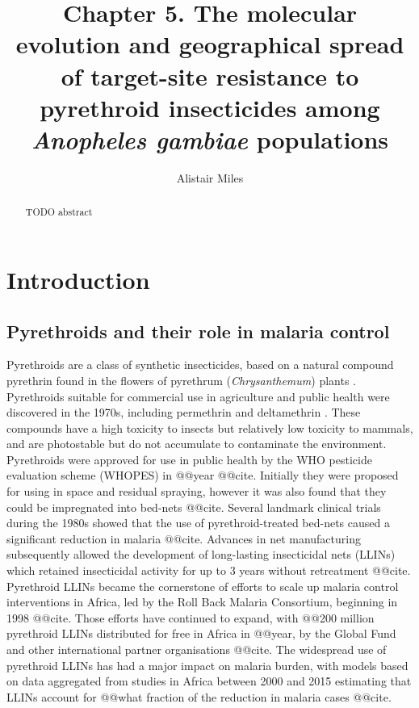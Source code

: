 \documentclass[a4paper,11pt,abstracton,hidelinks]{scrartcl}
\title{Chapter 5. The molecular evolution and geographical spread of target-site resistance to pyrethroid insecticides among \textit{Anopheles gambiae} populations}
\author[1,2]{\small Alistair Miles}
\affil[1]{\footnotesize Big Data Institute, University of Oxford, Li Ka Shing Centre for Health Information and Discovery, Old Road Campus, Oxford OX3 7LF}
\affil[2]{\footnotesize Wellcome Sanger Institute, Hinxton, Cambridge CB10 1SA}
\begin{document}
\maketitle


\begin{abstract}


TODO abstract


\end{abstract}


\section*{Introduction}


\subsection*{Pyrethroids and their role in malaria control}


%
Pyrethroids are a class of synthetic insecticides, based on a natural compound pyrethrin found in the flowers of pyrethrum (\textit{Chrysanthemum}) plants \autocite{Elliott1989}.
%
Pyrethroids suitable for commercial use in agriculture and public health were discovered in the 1970s, including permethrin \autocite{Elliott1973} and deltamethrin \autocite{Elliott1974}.
%
These compounds have a high toxicity to insects but relatively low toxicity to mammals, and are photostable but do not accumulate to contaminate the environment.
%
Pyrethroids were approved for use in public health by the WHO pesticide evaluation scheme (WHOPES) in @@year @@cite.
%
Initially they were proposed for using in space and residual spraying, however it was also found that they could be impregnated into bed-nets @@cite.
%
Several landmark clinical trials during the 1980s showed that the use of pyrethroid-treated bed-nets caused a significant reduction in malaria @@cite.
%
Advances in net manufacturing subsequently allowed the development of long-lasting insecticidal nets (LLINs) which retained insecticidal activity for up to 3 years without retreatment @@cite.
%
Pyrethroid LLINs became the cornerstone of efforts to scale up malaria control interventions in Africa, led by the Roll Back Malaria Consortium, beginning in 1998 @@cite.
%
Those efforts have continued to expand, with @@200 million pyrethroid LLINs distributed for free in Africa in @@year, by the Global Fund and other international partner organisations @@cite.
%
The widespread use of pyrethroid LLINs has had a major impact on malaria burden, with models based on data aggregated from studies in Africa between 2000 and 2015 estimating that LLINs account for @@what fraction of the reduction in malaria cases @@cite.
\end{document}
